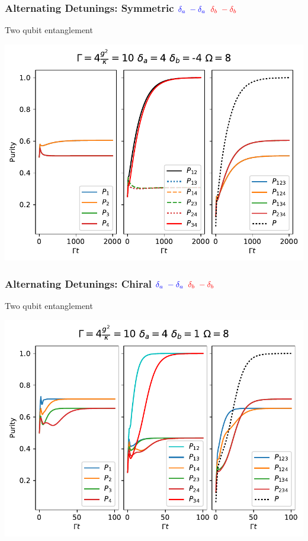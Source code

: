 \documentclass{beamer}
\begin{document}
\begin{frame}
\frametitle{Alternating Detunings: Symmetric \hspace{.5in} $\textcolor{blue}{\delta_a \; - \delta_a}$  $\textcolor{red}{\delta_b \;  - \delta_b}$}

Two qubit entanglement

\centering
\includegraphics[scale=0.7]{Sym_Alter.pdf}
\end{frame}

\begin{frame}
\frametitle{Alternating Detunings: Chiral \hspace{.5in} $\textcolor{blue}{\delta_a \; - \delta_a}$  $\textcolor{red}{\delta_b \;  - \delta_b}$}

Two qubit entanglement

\centering 
\includegraphics[scale=.70]{Chiral_Alternating.pdf}
\end{frame}
\end{document}
